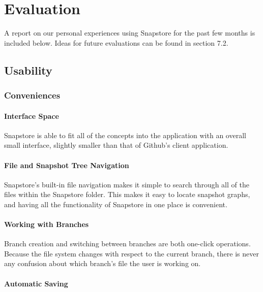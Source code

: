 \chapter{Evaluation}

A report on our personal experiences using Snapstore for the past few months is included below. Ideas for future evaluations can be found in section 7.2.

\section{Usability}

\subsection{Conveniences}

\subsubsection{Interface Space}

Snapstore is able to fit all of the concepts into the application with an overall small interface, slightly smaller than that of Github's client application. %

\subsubsection{File and Snapshot Tree Navigation}

Snapstore's built-in file navigation makes it simple to search through all of the files within the Snapstore folder. This makes it easy to locate snapshot graphs, and having all the functionality of Snapstore in one place is convenient.

\subsubsection{Working with Branches}

Branch creation and switching between branches are both one-click operations. Because the file system changes with respect to the current branch, there is never any confusion about which branch's file the user is working on.

\subsubsection{Automatic Saving}

